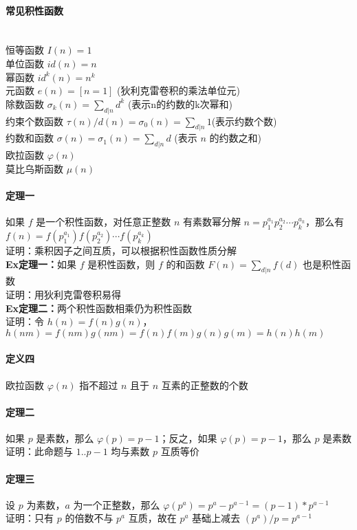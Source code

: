 	\paragraph{常见积性函数}~\\
	恒等函数 $I(n)=1$\\
	单位函数 $ id(n)=n$\\
	幂函数 $id^k(n)=n^k$\\
	元函数 $e(n)=[n=1]$      (狄利克雷卷积的乘法单位元)\\
	除数函数 $\sigma _k(n)=\sum_{d|n}d^k$ (表示n的约数的k次幂和)\\
	约束个数函数 $\tau (n)/d(n)=\sigma_0(n)=\sum_{d|n}1$(表示约数个数)\\
	约数和函数 $\sigma(n)=\sigma_1(n)=\sum_{d|n}d$ (表示 $n$ 的约数之和)\\
	欧拉函数 $\varphi(n)$\\
	莫比乌斯函数 $\mu(n)$\\
	\paragraph{定理一}如果 $f$  是一个积性函数，对任意正整数 $n$ 有素数幂分解 $n=p_1^{a_1}p_2^{a_2}\cdots p_k^{a_k}$，那么有 $f(n)=f(p_1^{a_1})f(p_2^{a_2})\cdots f(p_k^{a_k})$\\
	证明：乘积因子之间互质，可以根据积性函数性质分解\\
	\textbf{Ex定理一：}如果 $f$ 是积性函数，则 $f$ 的和函数 $F(n)=\sum_{d|n}f(d)$ 也是积性函数\\
	证明：用狄利克雷卷积易得\\
	\textbf{Ex定理二：}两个积性函数相乘仍为积性函数\\
	证明：令 $h(n)=f(n)g(n)$，$h(nm)=f(nm)g(nm)=f(n)f(m)g(n)g(m)=h(n)h(m)$\\
	\paragraph{定义四}欧拉函数 $\varphi(n)$ 指不超过 $n$ 且于 $n$ 互素的正整数的个数
	\paragraph{定理二}如果 $p$ 是素数，那么 $\varphi(p)=p-1$；反之，如果 $\varphi(p)=p-1$，那么 $p$ 是素数\\
	证明：此命题与 $1..p-1$ 均与素数 $p$ 互质等价
	\paragraph{定理三}设 $p$ 为素数，$a$ 为一个正整数，那么 $\varphi (p^{a})=p^{a}-p^{a-1}=(p-1)*p^{a-1}$\\
	证明：只有 $p$ 的倍数不与 $p^a$ 互质，故在 $p^a$ 基础上减去 $(p^a)/p=p^{a-1}$
